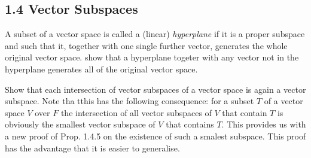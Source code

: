 \subsection*{1.4 Vector Subspaces}
\item A subset of a vector space is called a (linear) \emph{hyperplane} if it is a proper subspace and such that it, together with one single further vector, generates the whole original vector space. show that a hyperplane togeter with any vector not in the hyperplane generates all of the original vector space.
\item Show that each intersection of vector subspaces of a vector space is again a vector subspace. Note tha tthis has the following consequence: for a subset $T$ of a vector space $V$ over $F$ the intersection of all vector subspaces of $V$ that contain $T$ is obviously the smallest vector subspace of $V$ that contains $T$. This provides us with a new proof of Prop. 1.4.5 on the existence of such a smalest subspace. This proof has the advantage that it is easier to generalise.
